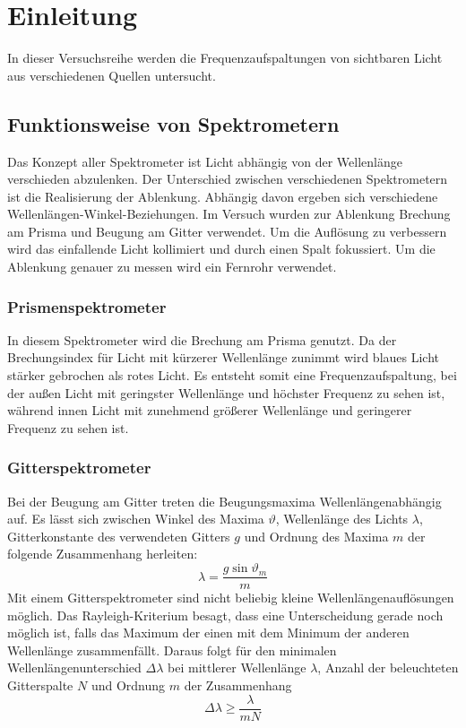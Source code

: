 \section{Einleitung}
In dieser Versuchsreihe werden die Frequenzaufspaltungen von sichtbaren Licht aus verschiedenen Quellen untersucht. 

\subsection{Funktionsweise von Spektrometern}
Das Konzept aller Spektrometer ist Licht abhängig von der Wellenlänge verschieden abzulenken. Der Unterschied zwischen verschiedenen Spektrometern ist die Realisierung der Ablenkung. Abhängig davon ergeben sich verschiedene Wellenlängen-Winkel-Beziehungen. Im Versuch wurden zur Ablenkung Brechung am Prisma und Beugung am Gitter verwendet. Um die Auflösung zu verbessern wird das einfallende Licht kollimiert und durch einen Spalt fokussiert. Um die Ablenkung genauer zu messen wird ein Fernrohr verwendet.
\subsubsection{Prismenspektrometer}
In diesem Spektrometer wird die Brechung am Prisma genutzt. Da der Brechungsindex für Licht mit kürzerer Wellenlänge zunimmt wird blaues Licht stärker gebrochen als rotes Licht. Es entsteht somit eine Frequenzaufspaltung, bei der außen Licht mit geringster Wellenlänge und höchster Frequenz zu sehen ist, während innen Licht mit zunehmend größerer Wellenlänge und geringerer Frequenz zu sehen ist.
\subsubsection{Gitterspektrometer}
Bei der Beugung am Gitter treten die Beugungsmaxima Wellenlängenabhängig auf. Es lässt sich zwischen Winkel des Maxima $ \vartheta $, Wellenlänge des Lichts $ \lambda $, Gitterkonstante des verwendeten Gitters $ g $ und Ordnung des Maxima $ m $ der folgende Zusammenhang herleiten:
\begin{equation}
	\lambda = \frac{g\sin\vartheta_m}{m}
\end{equation}
Mit einem Gitterspektrometer sind nicht beliebig kleine Wellenlängenauflösungen möglich. Das  Rayleigh-Kriterium besagt, dass eine Unterscheidung gerade noch möglich ist, falls das Maximum der einen mit dem Minimum der anderen Wellenlänge zusammenfällt. Daraus folgt für den minimalen Wellenlängenunterschied $ \Delta \lambda $ bei mittlerer Wellenlänge $ \lambda $, Anzahl der beleuchteten Gitterspalte $ N $ und Ordnung $ m $ der Zusammenhang
\begin{equation}
	\Delta\lambda \geq \frac{\lambda}{mN}
\end{equation}
